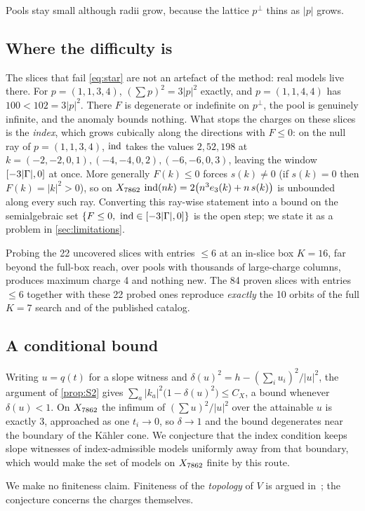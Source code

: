 Pools stay small although radii grow, because the lattice $p^\perp$ thins as $|p|$
grows.

\subsection{Where the difficulty is}

The slices that fail \eqref{eq:star} are not an artefact of the method: real
models live there. For $p=(1,1,3,4)$, $(\sum p)^2=3|p|^2$ exactly, and
$p=(1,1,4,4)$ has $100<102=3|p|^2$. There $F$ is degenerate or indefinite on
$p^\perp$, the pool is genuinely infinite, and the anomaly bounds nothing. What
stops the charges on these slices is the \emph{index}, which grows cubically
along the directions with $F\le0$: on the null ray of $p=(1,1,3,4)$, $\operatorname{ind}$ takes
the values $2,52,198$ at $k=(-2,-2,0,1),(-4,-4,0,2),(-6,-6,0,3)$, leaving the
window $[-3|\Gamma|,0]$ at once. More generally $F(k)\le0$ forces $s(k)\ne0$ (if
$s(k)=0$ then $F(k)=|k|^2>0$), so on $X_{7862}$
$\operatorname{ind}(nk)=2\bigl(n^3e_3(k)+n\,s(k)\bigr)$ is unbounded along every such ray.
Converting this ray-wise statement into a bound on the semialgebraic set
$\{F\le0,\ \ind\in[-3|\Gam|,0]\}$ is the open step; we state it as a problem in
\cref{sec:limitations}.

Probing the 22 uncovered slices with entries $\le6$ at an in-slice box $K=16$,
far beyond the full-box reach, over pools with thousands of large-charge
columns, produces maximum charge 4 and nothing new. The 84 proven slices with
entries $\le6$ together with these 22 probed ones reproduce \emph{exactly} the
10 orbits of the full $K=7$ search and of the published catalog.

\subsection{A conditional bound}

\begin{conjecture}\label{conj:C1}
Writing $u=q(t)$ for a slope witness and
$\delta(u)^2=h-(\sum_iu_i)^2/|u|^2$, the argument of \cref{prop:S2} gives
$\sum_a|k_a|^2\bigl(1-\delta(u)^2\bigr)\le C_X$, a bound whenever $\delta(u)<1$.
On $X_{7862}$ the infimum of $(\sum u)^2/|u|^2$ over the attainable $u$ is exactly 3,
approached as one $t_i\to0$, so $\delta\to1$ and the bound degenerates near the
boundary of the Kähler cone. We conjecture that the index condition keeps slope
witnesses of index-admissible models uniformly away from that boundary, which
would make the set of models on $X_{7862}$ finite by this route.
\end{conjecture}

We make no finiteness claim. Finiteness of the \emph{topology} of
$V$ is argued in~\cite{ACGLP2013}; the conjecture concerns the charges
themselves.
